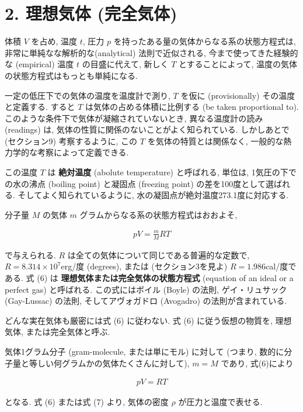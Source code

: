 \section*{2. 理想気体 (完全気体)}
体積 $V$ を占め, 温度 $t$, 圧力 $p$ を持ったある量の気体からなる系の状態方程式は, 非常に単純なな解析的な(analytical) 法則で近似される, 今まで使ってきた経験的な (empirical) 温度 $t$ の目盛に代えて, 新しく $T$ とすることによって, 温度の気体の状態方程式はもっとも単純になる. \par
一定の低圧下での気体の温度を温度計で測り, $T$ を仮に (provisionally) その温度と定義する. すると $T$ は気体の占める体積に比例する (be taken proportional to). このような条件下で気体が凝縮されていないとき, 異なる温度計の読み (readings) は, 気体の性質に関係のないことがよく知られている. しかしあとで (セクション9) 考察するように, この $T$ を気体の特質とは関係なく, 一般的な熱力学的な考察によって定義できる. \par
この温度 $T$ は \textbf{絶対温度} (abolute temperature) と呼ばれる, 単位は, 1気圧の下での水の沸点 (boiling point) と凝固点 (freezing point) の差を100度として選ばれる. そしてよく知られているように, 水の凝固点が絶対温度273.1度に対応する. \par
分子量 $M$ の気体 $m$ グラムからなる系の状態方程式はおおよそ, 

\begin{align}\tag{6}
pV=\frac{m}{M}RT
\end{align}

で与えられる. $R$ は全ての気体について同じである普遍的な定数で, $R=8.314\times10^7$erg/度 (degrees), または (セクション3を見よ) $R=1.986$cal/度である. 式 (6) は \textbf{理想気体または完全気体の状態方程式} (equation of an ideal or a perfect gas) と呼ばれる. この式にはボイル (Boyle) の法則, ゲイ・リュサック (Gay-Lussac) の法則, そしてアヴォガドロ (Avogadro) の法則が含まれている.\par
どんな実在気体も厳密には式 (6) に従わない. 式 (6) に従う仮想の物質を, 理想気体, または完全気体と呼ぶ.\par
気体1グラム分子 (gram-molecule, または単にモル) に対して (つまり, 数的に分子量と等しい何グラムかの気体たくさんに対して), $m=M$ であり, 式(6)により

\begin{align}\tag{7}
pV=RT
\end{align}

となる. 式 (6) または式 (7) より, 気体の密度 $\rho$ が圧力と温度で表せる. 

